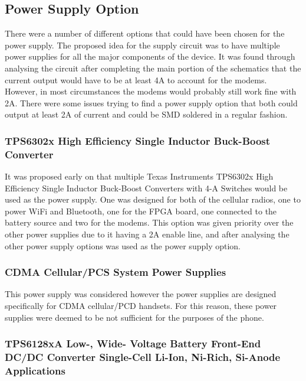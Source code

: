 \subsection{Power Supply Option}

	There were a number of different options that could have been chosen for the power supply. 
The proposed idea for the supply circuit was to have multiple power supplies for all the major components of the device. 
It was found through analysing the circuit after completing the main portion of the schematics that the current output would have to be at least 4A to account for the modems. 
However, in most circumstances the modems would probably still work fine with 2A. 
There were some issues trying to find a power supply option that both could output at least 2A of current and could be SMD soldered in a regular fashion. 

\subsubsection{TPS6302x High Efficiency Single Inductor Buck-Boost Converter}

It was proposed early on that multiple Texas Instruments TPS6302x High Efficiency Single Inductor Buck-Boost Converters with 4-A Switches would be used as the power supply. 
One was designed for both of the cellular radios, one to power WiFi and Bluetooth, one for the FPGA board, one connected to the battery source and two for the modems. 
This option was given priority over the other power supplies due to it having a 2A enable line, and after analysing the other power supply options was used as the power supply option. 


\subsubsection{CDMA Cellular/PCS System Power Supplies}

This power supply was considered however the power supplies are designed specifically for CDMA cellular/PCD handsets. For this reason, these power supplies were deemed to be not sufficient for the purposes of the phone. 

\subsubsection{TPS6128xA Low-, Wide- Voltage Battery Front-End DC/DC Converter Single-Cell Li-Ion, Ni-Rich, Si-Anode Applications}


